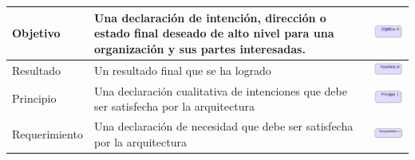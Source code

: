 \begin{table}[h!]
\begin{center}
\begin{tabular}{| m{6em} | m{7cm}| m{3cm} |}
			\\
			\hline
			Objetivo 
			& 
			Una declaración de intención, dirección o estado final deseado de alto nivel para una organización y sus partes interesadas. 
			& \includegraphics[width=0.8\linewidth, height=0.05\textheight]{imgs/Elementos/Objetivo.PNG}
			\\
			\hline
			Resultado 
			& 
			Un resultado final que se ha logrado
			& \includegraphics[width=0.8\linewidth, height=0.05\textheight]{imgs/Elementos/Resultado.PNG}
			\\
			\hline
			Principio 
			& 
			Una declaración cualitativa de intenciones que debe ser satisfecha por la arquitectura
			& \includegraphics[width=0.8\linewidth, height=0.05\textheight]{imgs/Elementos/Principio.PNG}
			\\
			\hline
			Requerimiento 
			& 
			Una declaración de necesidad que debe ser satisfecha por la arquitectura
			& \includegraphics[width=0.8\linewidth, height=0.05\textheight]{imgs/Elementos/Requerimiento.PNG}

\end{tabular}
\end{center}
\end{table}

